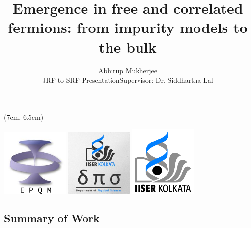 \documentclass[10pt,aspectratio=169]{beamer}
\title{Emergence in free and correlated fermions: from impurity models to the bulk}
\author{
\centering
{\Large Abhirup Mukherjee}\vspace*{10pt}\\
JRF-to-SRF Presentation\hspace*{\fill}Supervisor: Dr. Siddhartha Lal}
\institute{Department of Physical Sciences\\
IISER Kolkata, Mohanpur}
\begin{document}
\centering

\begin{frame}
\maketitle
\begin{textblock*}{0.6\textwidth}(7cm, 6.5cm)
	\centering
	\vspace*{\fill}

	\includegraphics[width=0.25\textwidth]{figures/epqm_logo_mod.jpeg}
	\hspace*{\fill}
	\includegraphics[width=0.25\textwidth]{figures/dps_logo.jpeg}
	\hspace*{\fill}
	\includegraphics[width=0.25\textwidth]{figures/IISER-K_Logo.png}
	\vspace*{\fill}
\end{textblock*}
\end{frame}

\begin{frame}{}
\section{Summary of Work}
\end{frame}
\end{document}
